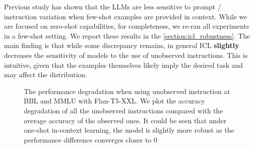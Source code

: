 Previous study \cite{gu2023robustness} has shown that the LLMs are less sensitive to prompt / instruction variation when few-shot examples are provided in context.
While we are focused on zero-shot capabilities, for completeness, we re-ran all experiments in a few-shot setting.
We report these results in the \ref{section:icl_robustness}. The main finding is that while some discrepancy remains, in general ICL \textbf{slightly} decreases the sensitivity of models to the use of unobserved instructions.
This is intuitive, given that the examples themselves likely imply the desired task and may affect the distribution.

\begin{figure}
  \centering
  \caption{The performance degradation when using unobserved instruction at \textsc{BBL} and \textsc{MMLU} with Flan-T5-XXL. We plot the accuracy degradation of all the unobserved instructions compared with the average accuracy of the observed ones. It could be seen that under one-shot in-context learning, the model is slightly more robust as the performance difference converges closer to 0}
  \label{fig:icl}
\end{figure}

